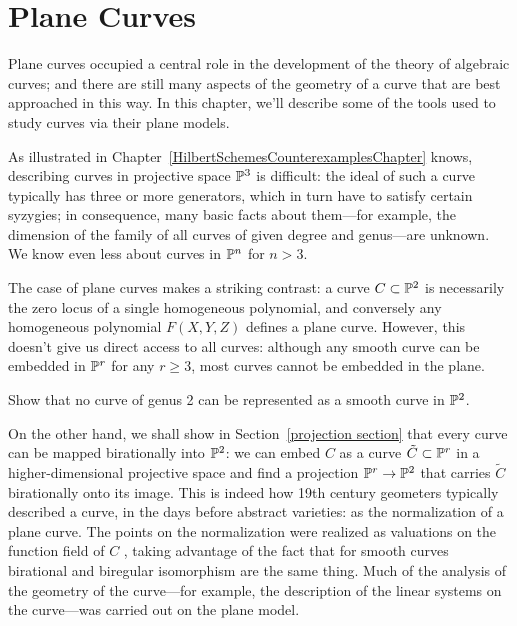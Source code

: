 

\chapter{Plane Curves}
\label{PlaneCurvesChapter}

Plane curves occupied a central role in the development of the theory of algebraic curves; and there are still many aspects of the geometry of a curve that are best approached in this way. In this chapter, we'll describe some of the tools used to study  curves via their plane models.

As illustrated in Chapter~\ref{HilbertSchemesCounterexamplesChapter} knows, describing curves in projective space ${\mathbb P}^3$  is difficult: the ideal of such a curve typically has three or more generators, which in turn have to satisfy certain syzygies; in consequence, many basic facts about them---for example, the dimension of the family of all curves of given degree and genus---are unknown. We know even less about curves in ${\mathbb P}^n$ for $n > 3$.

The case of plane curves makes a striking contrast: a curve $C \subset {\mathbb P}^2$ is necessarily the zero locus of a single homogeneous polynomial, and conversely any homogeneous polynomial $F(X,Y,Z)$ defines a plane curve. However, this doesn't give us direct access to all curves: although any smooth curve can be embedded in ${\mathbb P}^r$ for any $r \geq 3$, most curves cannot be embedded in the plane.

\begin{exercise}
 Show that no curve of genus 2 can be represented as a smooth curve in ${\mathbb P}^2$.
\end{exercise}

On the other hand, we shall show in Section~\ref{projection section} that every curve can be mapped birationally into ${\mathbb P}^2$: we can embed $C$ as a curve $\tilde C \subset {\mathbb P}^r$ in a higher-dimensional projective space and find a projection ${\mathbb P}^r \to {\mathbb P}^2$ that carries $\tilde C$ birationally onto its image. This is indeed how 19th century geometers typically described a curve, in the days before abstract varieties: as the normalization of a plane curve. The points on the normalization were realized as valuations on the function field of $C$ ,  taking advantage of the fact that for smooth curves birational and biregular isomorphism are the same thing. Much of the analysis of the geometry of the curve---for example, the description of the linear systems on the curve---was carried out on the plane model.


